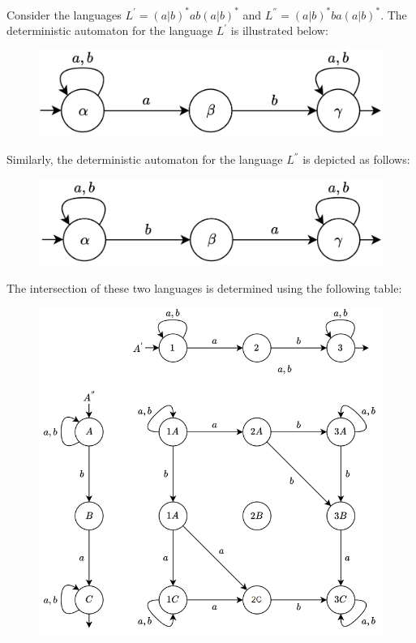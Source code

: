 \begin{example}
    Consider the languages $L^{'}=(a|b)^{*}ab(a|b)^{*}$ and $L^{''}=(a|b)^{*}ba(a|b)^{*}$. 
    The deterministic automaton for the language $L^{'}$ is illustrated below:
    \begin{figure}[H]
        \centering
        \includegraphics[width=0.5\linewidth]{images/int.png}
    \end{figure}
    Similarly, the deterministic automaton for the language $L^{''}$ is depicted as follows:
    \begin{figure}[H]
        \centering
        \includegraphics[width=0.5\linewidth]{images/int1.png}
    \end{figure}
    The intersection of these two languages is determined using the following table:
    \begin{figure}[H]
        \centering
        \includegraphics[width=0.65\linewidth]{images/int2.png}
    \end{figure}
\end{example}